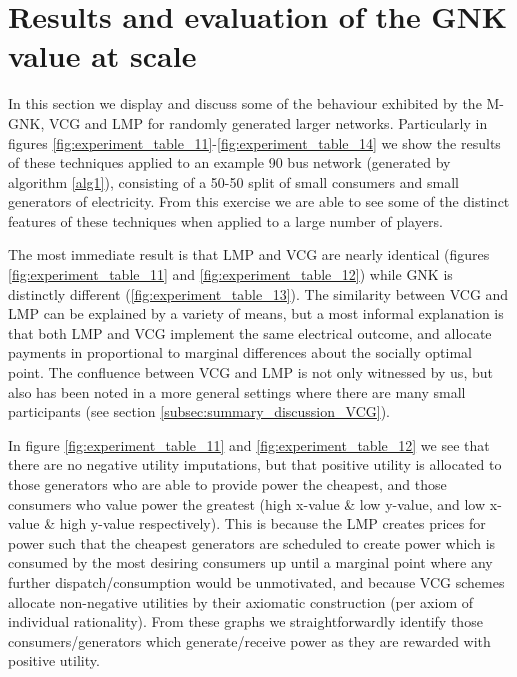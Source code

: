 



\section{Results and evaluation of the GNK value at scale}\label{sec:results_and_evaluation_of_GNK}



In this section we display and discuss some of the behaviour exhibited by the M-GNK, VCG and LMP for randomly generated larger networks.
Particularly in figures \ref{fig:experiment_table_11}-\ref{fig:experiment_table_14} we show the results of these techniques applied to an example 90 bus network (generated by algorithm \ref{alg1}), consisting of a 50-50 split of small consumers and small generators of electricity.
From this exercise we are able to see some of the distinct features of these techniques when applied to a large number of players.

The most immediate result is that LMP and VCG are nearly identical (figures \ref{fig:experiment_table_11} and \ref{fig:experiment_table_12}) while GNK is distinctly different (\ref{fig:experiment_table_13}).
The similarity between VCG and LMP can be explained by a variety of means, but a most informal explanation is that both LMP and VCG implement the same electrical outcome, and allocate payments in proportional to marginal differences about the socially optimal point.
The confluence between VCG and LMP is not only witnessed by us, but also has been noted in a more general settings where there are many small participants \citep{NATH2019673, 8430852} (see section \ref{subsec:summary_discussion_VCG}).%

In figure \ref{fig:experiment_table_11} and \ref{fig:experiment_table_12} we see that there are no negative utility imputations, but that positive utility is allocated to those generators who are able to provide power the cheapest, and those consumers who value power the greatest (high x-value \& low y-value, and low x-value \& high y-value respectively).
This is because the LMP creates prices for power such that the cheapest generators are scheduled to create power which is consumed by the most desiring consumers up until a marginal point where any further dispatch/consumption would be unmotivated, and because VCG schemes allocate non-negative utilities by their axiomatic construction (per axiom of individual rationality).
From these graphs we straightforwardly identify those consumers/generators which generate/receive power as they are rewarded with positive utility.

